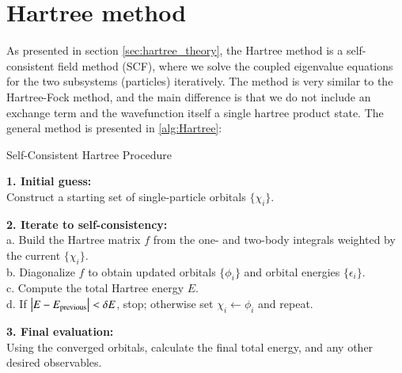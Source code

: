 \documentclass{subfiles}
\begin{document}
\section{Hartree method}\label{sec:Hartree_method}
As presented in section \ref{sec:hartree_theory}, the Hartree method is a self-consistent field method (SCF), where we solve the coupled eigenvalue equations for the two subsystems (particles) iteratively. The method is very similar to the Hartree-Fock method, and the main difference is that we do not include an exchange term and the wavefunction itself a single hartree product state. The general method is presented in \ref{alg:Hartree}:
\begin{algorithm}[h!]
\caption{Self-Consistent Hartree Procedure}
\medskip
\noindent\textbf{1. Initial guess:}\\
\quad Construct a starting set of single-particle orbitals \(\{\chi_i\}\).  

\medskip
\noindent\textbf{2. Iterate to self-consistency:}\\
\quad a. Build the Hartree matrix \(f\) from the one- and two-body integrals weighted by the current \(\{\chi_i\}\).\\
\quad b. Diagonalize \(f\) to obtain updated orbitals \(\{\phi_i\}\) and orbital energies \(\{\epsilon_i\}\).\\
\quad c. Compute the total Hartree energy \(E\).\\
\quad d. If \(\bigl|E - E_{\rm previous}\bigr| < \delta E\), stop; otherwise set \(\chi_i \leftarrow \phi_i\) and repeat.

\medskip
\noindent\textbf{3. Final evaluation:}\\
\quad Using the converged orbitals, calculate the final total energy, and any other desired observables.\label{alg:Hartree}
\end{algorithm}
\end{document}
